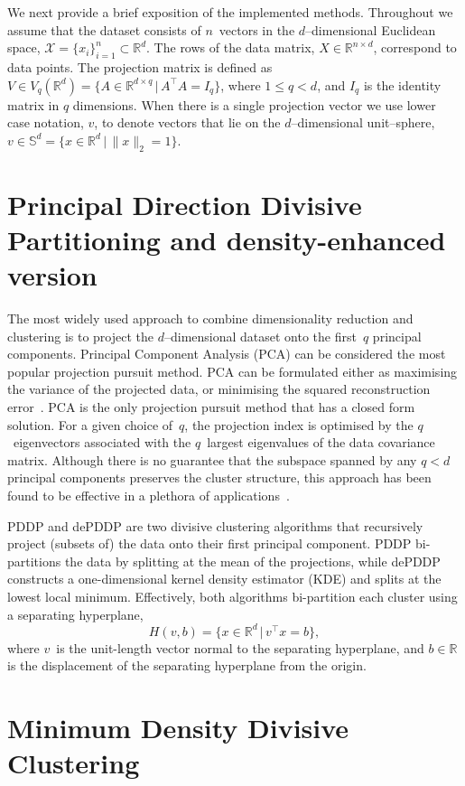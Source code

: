 \documentclass{book}
\def\R{\mathbb{R}}
\begin{document}
\noindent
%
We next provide a brief exposition of the implemented methods.
Throughout we assume that the
dataset consists of $n$~vectors in the $d$--dimensional Euclidean space,
$\mathcal{X} = \{x_i\}_{i=1}^n \subset \R^d$.
%
The rows of the data matrix,
$X \in \R^{n \times d}$, correspond to data points. 
%
The projection matrix is defined as
%
$V \in V_q(\R^d) = \{A \in \R^{d \times q} \,|\, A^\top A = I_q\}$, where 
$1\leqslant q<d$, and $I_q$ is the identity matrix in $q$ dimensions.
%
When there is a single projection vector we use lower case notation, $v$,
to denote vectors that lie on the $d$--dimensional unit--sphere,
$v \in \mathbb{S}^{d} = \{ x \in \R^d \,|\, \|x\|_2=1\}$.


\section{Principal Direction Divisive Partitioning and density-enhanced version}

The most widely used approach to combine dimensionality reduction and
clustering is to project the $d$--dimensional dataset onto the first~$q$
principal components. 
%
Principal Component Analysis (PCA) can be considered the most popular
projection pursuit method. PCA can be formulated either as maximising the
variance of the projected data, or minimising the squared reconstruction
error~\cite{Jolliffe1986}. PCA is the only projection pursuit method that has a
closed form solution. For a given choice of~$q$, the projection index is
optimised by the $q$~eigenvectors associated with the $q$~largest eigenvalues
of the data covariance matrix.
%
Although there is no guarantee that the subspace spanned by any $q<d$ principal
components preserves the cluster structure, this approach has been found to be
effective in a plethora of applications~\cite{KriegelKZ2009}.


PDDP and dePDDP are two divisive clustering algorithms that recursively
project (subsets of) the data onto their first principal component.
PDDP bi-partitions the data by splitting at the mean of the projections, while
dePDDP constructs a one-dimensional kernel density estimator (KDE) and splits
at the lowest local minimum.
%
Effectively, both algorithms bi-partition each cluster 
using a separating hyperplane,
\[
H(v,b) = \{x \in \R^d \,|\, v^\top x= b\},
\]
where $v$~is the unit-length
vector normal to the separating hyperplane,
and $b \in \R$ is the displacement of the separating hyperplane from the origin.


\section{Minimum Density Divisive Clustering}
\end{document}

